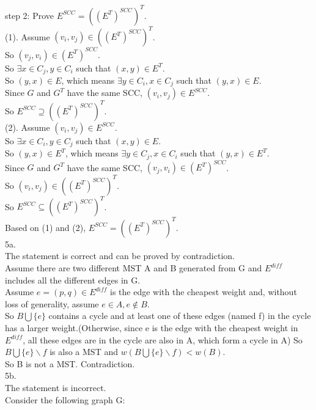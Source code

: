 \documentclass{article}
\begin{document}
step 2: Prove $E^{SCC} = ((E^T)^{SCC})^T$.\\
(1). Assume $(v_i, v_j) \in ((E^T)^{SCC})^T$.\\
So $(v_j, v_i) \in (E^T)^{SCC}$.\\
So $\exists x \in C_j, y \in C_i$ such that $(x, y) \in E^T$.\\
So $(y, x) \in E$, which means $\exists y \in C_i, x \in C_j$ such that $(y, x) \in E$.\\
Since $G$ and $G^T$ have the same SCC, $(v_i, v_j) \in E^{SCC}$.\\
So $E^{SCC} \supseteq ((E^T)^{SCC})^T$.\\
(2). Assume $(v_i, v_j) \in E^{SCC}$.\\
So $\exists x \in C_i, y \in C_j$ such that $(x, y) \in E$.\\
So $(y, x) \in E^T$, which means $\exists y \in C_j, x \in C_i$ such that $(y, x) \in E^T$.\\
Since $G$ and $G^T$ have the same SCC, $(v_j, v_i) \in (E^T)^{SCC}$.\\
So $(v_i, v_j) \in ((E^T)^{SCC})^T$.\\
So $E^{SCC} \subseteq ((E^T)^{SCC})^T$.\\
Based on (1) and (2), $E^{SCC} = ((E^T)^{SCC})^T$.\\

5a.\\
The statement is correct and can be proved by contradiction.\\
Assume there are two different MST A and B generated from G and $E^{diff}$ includes all the different edges in G.\\
Assume $e = (p, q) \in E^{diff}$ is the edge with the cheapest weight and, without loss of generality, assume $e \in A, e \notin B$.\\
So $B \bigcup \{e\}$ contains a cycle and at least one of these edges (named f) in the cycle has a larger weight.(Otherwise, since e is the edge with the cheapest weight in $E^{diff}$, all these edges are in the cycle are also in A, which form a cycle in A)
So $B \bigcup \{e\} \backslash {f}$ is also a MST and $w(B \bigcup \{e\} \backslash {f}) < w(B)$.\\
So B is not a MST. Contradiction.\\

5b.\\
The statement is incorrect.\\
Consider the following graph G:\\
\end{document}
